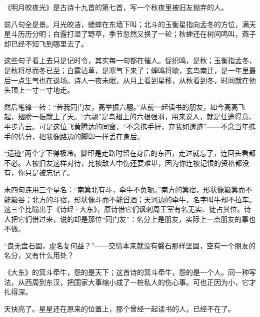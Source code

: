 \begin{appreciation}
《明月皎夜光》是古诗十九首的第七首，写一个秋夜里被旧友抛弃的人。

前八句全是景。月光皎洁，蟋蟀在东墙下叫；北斗的玉衡星指向孟冬的方位，满天星斗历历分明；白露打湿了野草，季节忽然又换了一轮；秋蝉还在树间鸣叫，燕子却已经不知飞到哪里去了。

这些句子看上去只是记时令，其实每一句都在催人。促织鸣，是秋；玉衡指孟冬，是秋将尽而冬已至；白露沾草，是寒气下来了；蝉鸣将歇，玄鸟南迁，是一年里最后一点生气也在退场。诗人一夜未眠，从月上看到星移，从秋看到冬，时间就在他头顶上一寸一寸地走。

然后笔锋一转：“昔我同门友，高举振六翮。”从前一起读书的朋友，如今高高飞起，翅膀一振就上了天。“六翮”是鸟翅上的六根强羽，用来说人，就是仕途得意、平步青云。可是这位飞黄腾达的同窗，“不念携手好，弃我如遗迹”——不念当年携手的情分，把我像路边的脚印一样丢在身后。

“遗迹”两个字下得极冷。脚印是走路时留在身后的东西，走过就忘了，连回头看都不必。人被旧友这样对待，比被敌人中伤还要难堪，因为你连被记恨的资格都没有，你只是被忘记了。

末四句连用三个星名：“南箕北有斗，牵牛不负轭。”南方的箕宿，形状像簸箕而不能簸谷；北方的斗宿，形状像斗而不能舀酒；天河边的牵牛，名字叫牛却不拉车。这三个比喻出于《诗经·大东》，原诗借它们讽刺周王室有名无实、徒占其位。诗人把它们借过来，说的却是那位“同门友”：名分上是朋友，实际上一点朋友的事也不做。

“良无盘石固，虚名复何益？”——交情本来就没有磐石那样坚固，空有一个朋友的名分，又有什么用处？

《大东》的箕斗牵牛，怨的是天下；这首诗的箕斗牵牛，怨的是一个人。同一种写法，从西周到东汉，把国家大事缩小成了一桩私人的伤心事。可也正因为小，它才扎得深。

天快亮了。星星还在原来的位置上，那个曾经一起读书的人，已经不在了。
\end{appreciation}
